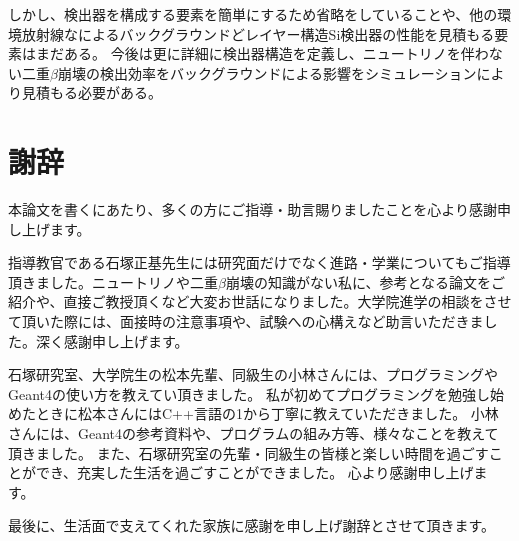 \documentclass[a4paper,10pt]{jreport}
\begin{document}
しかし、検出器を構成する要素を簡単にするため省略をしていることや、他の環境放射線なによるバックグラウンドどレイヤー構造Si検出器の性能を見積もる要素はまだある。
今後は更に詳細に検出器構造を定義し、ニュートリノを伴わない二重$\beta$崩壊の検出効率をバックグラウンドによる影響をシミュレーションにより見積もる必要がある。



\chapter*{謝辞}

本論文を書くにあたり、多くの方にご指導・助言賜りましたことを心より感謝申し上げます。

指導教官である石塚正基先生には研究面だけでなく進路・学業についてもご指導頂きました。ニュートリノや二重$\beta$崩壊の知識がない私に、参考となる論文をご紹介や、直接ご教授頂くなど大変お世話になりました。大学院進学の相談をさせて頂いた際には、面接時の注意事項や、試験への心構えなど助言いただきました。深く感謝申し上げます。

石塚研究室、大学院生の松本先輩、同級生の小林さんには、プログラミングやGeant4の使い方を教えてい頂きました。
私が初めてプログラミングを勉強し始めたときに松本さんにはC++言語の1から丁寧に教えていただきました。
小林さんには、Geant4の参考資料や、プログラムの組み方等、様々なことを教えて頂きました。
また、石塚研究室の先輩・同級生の皆様と楽しい時間を過ごすことができ、充実した生活を過ごすことができました。
心より感謝申し上げます。

最後に、生活面で支えてくれた家族に感謝を申し上げ謝辞とさせて頂きます。
\end{document}
